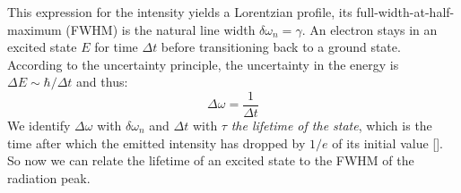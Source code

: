 \documentclass{article}
\begin{document}
This expression for the intensity yields a Lorentzian profile, its full-width-at-half-maximum (FWHM) is the natural line width $\delta\omega_n = \gamma$. An electron stays in an excited state $E$ for time $\Delta t$ before transitioning back to a ground state. According to the uncertainty principle, the uncertainty in the energy is $\Delta E\sim \hbar/\Delta t$ and thus: 
\begin{equation}
    \Delta\omega = \frac{1}{\Delta t}
\end{equation}
We identify $\Delta\omega$ with $\delta\omega_n$ and $\Delta t$ with $\tau$ \textit{the lifetime of the state}, which is the time after which the emitted intensity has dropped by $1/e$ of its initial value [\cite{jung_2018_dopplerfree}]. So now we can relate the lifetime of an excited state to the FWHM of the radiation peak. 

\pagebreak{}
\end{document}
